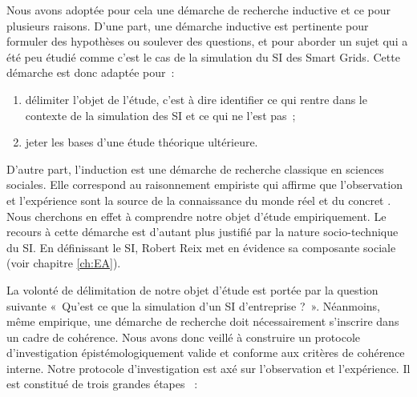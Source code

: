 Nous avons adoptée pour cela une démarche de recherche inductive et ce pour plusieurs raisons.
D'une part, une démarche inductive est pertinente pour formuler des hypothèses ou soulever des questions,
et pour aborder un sujet qui a été peu étudié comme c'est le cas de la simulation du SI des Smart Grids.	
Cette démarche est donc adaptée pour~: 
	\begin{enumerate}
	\item délimiter l'objet de l'étude, c'est à dire identifier ce qui rentre dans le 
contexte de la simulation des SI et ce qui ne l'est pas~;
	\item jeter les bases d'une étude théorique ultérieure.
	\end{enumerate}
	
	D'autre part, l'induction est une démarche de recherche classique en sciences 
sociales. Elle correspond au raisonnement empiriste qui affirme que 
l'observation et l'expérience sont la source de la connaissance du monde réel et 
du concret \cite{madeleine2001methodes}. Nous cherchons en effet à comprendre 
notre objet d'étude empiriquement. Le recours à cette démarche est d'autant plus 
justifié par la nature socio-technique du SI. En définissant le SI, Robert Reix 
met en évidence sa composante sociale (voir chapitre \ref{ch:EA}). 
	

	La volonté de délimitation de notre objet d'étude est portée par la question 
suivante «~Qu'est ce que la simulation d'un SI d'entreprise ?~». Néanmoins, même 
empirique, une démarche de recherche doit nécessairement s'inscrire dans un 
cadre de cohérence. Nous avons donc veillé à construire un protocole 
d'investigation épistémologiquement valide et conforme aux critères de cohérence 
interne. Notre protocole d'investigation est axé sur l'observation et 
l'expérience. Il est constitué de trois grandes étapes ~:
		
